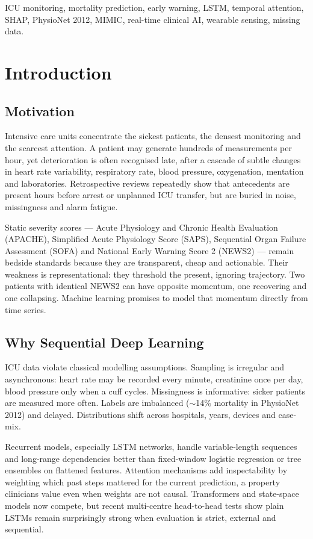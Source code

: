 \documentclass[a4paper,conference]{IEEEtran}
\begin{document}
\begin{IEEEkeywords}
ICU monitoring, mortality prediction, early warning, LSTM, temporal attention, SHAP, PhysioNet 2012, MIMIC, real-time clinical AI, wearable sensing, missing data.
\end{IEEEkeywords}

\section{Introduction}
\subsection{Motivation}
Intensive care units concentrate the sickest patients, the densest monitoring and the scarcest attention. A patient may generate hundreds of measurements per hour, yet deterioration is often recognised late, after a cascade of subtle changes in heart rate variability, respiratory rate, blood pressure, oxygenation, mentation and laboratories. Retrospective reviews repeatedly show that antecedents are present hours before arrest or unplanned ICU transfer, but are buried in noise, missingness and alarm fatigue.

Static severity scores --- Acute Physiology and Chronic Health Evaluation (APACHE), Simplified Acute Physiology Score (SAPS), Sequential Organ Failure Assessment (SOFA) and National Early Warning Score 2 (NEWS2) --- remain bedside standards because they are transparent, cheap and actionable. Their weakness is representational: they threshold the present, ignoring trajectory. Two patients with identical NEWS2 can have opposite momentum, one recovering and one collapsing. Machine learning promises to model that momentum directly from time series.

\subsection{Why Sequential Deep Learning}
ICU data violate classical modelling assumptions. Sampling is irregular and asynchronous: heart rate may be recorded every minute, creatinine once per day, blood pressure only when a cuff cycles. Missingness is informative: sicker patients are measured more often. Labels are imbalanced ($\sim$14\% mortality in PhysioNet 2012) and delayed. Distributions shift across hospitals, years, devices and case-mix.

Recurrent models, especially LSTM networks, handle variable-length sequences and long-range dependencies better than fixed-window logistic regression or tree ensembles on flattened features. Attention mechanisms add inspectability by weighting which past steps mattered for the current prediction, a property clinicians value even when weights are not causal. Transformers and state-space models now compete, but recent multi-centre head-to-head tests show plain LSTMs remain surprisingly strong when evaluation is strict, external and sequential.
\end{document}
